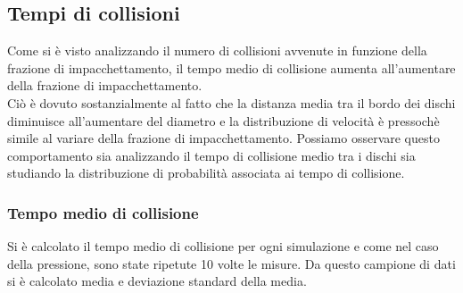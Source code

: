 
\subsection{Tempi di collisioni}

Come si è visto analizzando il numero di collisioni avvenute in funzione della frazione di impacchettamento, il tempo medio di collisione aumenta all'aumentare della frazione di impacchettamento.\\
Ciò è dovuto sostanzialmente al fatto che la distanza media tra il bordo dei dischi diminuisce all'aumentare del diametro e la distribuzione di velocità è pressochè simile al variare della frazione di impacchettamento.
Possiamo osservare questo comportamento sia analizzando il tempo di collisione medio tra i dischi sia studiando la distribuzione di probabilità associata ai tempo di collisione.

\subsubsection*{Tempo medio di collisione}
Si è calcolato il tempo medio di collisione per ogni simulazione e come nel caso della pressione, sono state ripetute 10 volte le misure. Da questo campione di dati si è calcolato media e deviazione standard della media.

